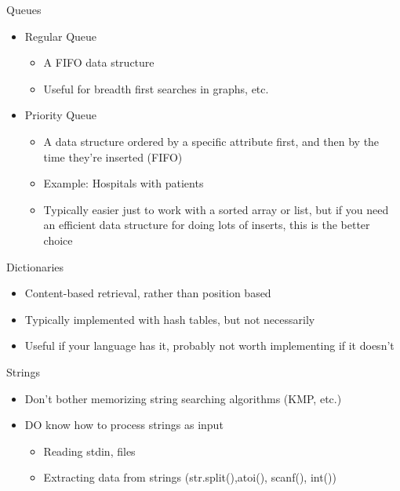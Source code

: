 \documentclass{beamer}
\begin{document}
\begin{frame}{Queues}
  \begin{centering}
    \begin{itemize}
      \item Regular Queue
      \begin{itemize}
        \item A FIFO data structure
        \item Useful for breadth first searches in graphs, etc.
      \end{itemize}
      \item Priority Queue
      \begin{itemize}
        \item A data structure ordered by a specific attribute first, and then by the time they're inserted (FIFO)
        \item Example: Hospitals with patients
        \item Typically easier just to work with a sorted array or list, but if you need an efficient data structure for doing lots of inserts, this is the better choice
      \end{itemize}
    \end{itemize}
  \end{centering}
\end{frame}

\begin{frame}{Dictionaries}
  \begin{centering}
    \begin{itemize}
      \item Content-based retrieval, rather than position based
      \item Typically implemented with hash tables, but not necessarily
      \item Useful if your language has it, probably not worth implementing if it doesn't
    \end{itemize}
  \end{centering}
\end{frame}

\begin{frame}{Strings}
  \begin{centering}
    \begin{itemize}
      \item Don't bother memorizing string searching algorithms (KMP, etc.)
      \item DO know how to process strings as input
      \begin{itemize}
        \item Reading stdin, files
        \item Extracting data from strings (str.split(),atoi(), scanf(), int())
      \end{itemize}
    \end{itemize}
  \end{centering}
\end{frame}
\end{document}
